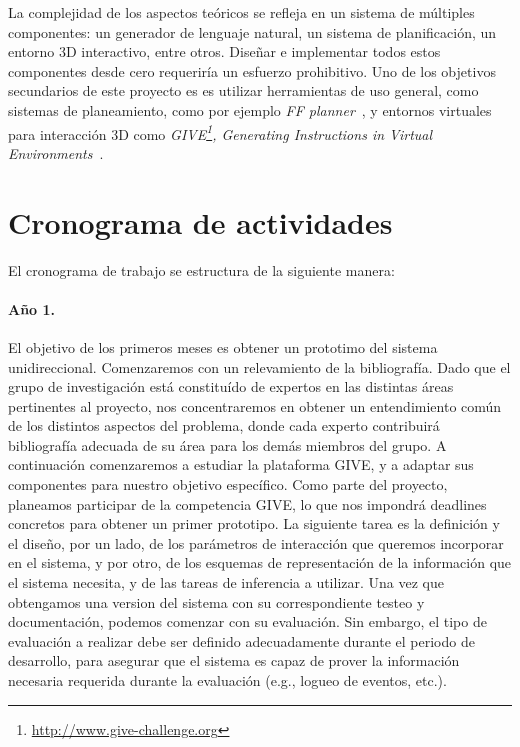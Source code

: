 \documentclass[11pt]{article}
\begin{document}
La complejidad de los aspectos
te\'oricos se refleja en un sistema de m\'ultiples componentes: un generador de
lenguaje natural, un sistema de planificaci\'on, un entorno 3D interactivo,
entre otros. Dise\~nar e implementar todos estos componentes desde cero
requerir\'ia un esfuerzo prohibitivo. Uno de los objetivos secundarios de este
proyecto es es utilizar herramientas de uso general, como sistemas de
planeamiento, como por ejemplo \emph{FF planner}~\citep{hoffmann01}, y
entornos virtuales para interacci\'on 3D como
\emph{GIVE\footnote{\url{http://www.give-challenge.org}}, Generating
Instructions in Virtual Environments}~\citep{byron09}. 

\section{Cronograma de actividades}



El cronograma de trabajo se estructura de la siguiente manera:

\paragraph{A\~no 1.} El objetivo de los primeros meses es obtener un
prototimo del sistema unidireccional.  Comenzaremos con un relevamiento
de la bibliograf\'ia.  Dado que el grupo de investigaci\'on est\'a
constitu\'ido de expertos en las distintas \'areas pertinentes al
proyecto, nos concentraremos en obtener un
entendimiento com\'un de los distintos aspectos del problema, donde
cada experto contribuir\'a bibliograf\'ia adecuada de su \'area para los
dem\'as miembros del grupo.  A continuaci\'on comenzaremos a estudiar
la plataforma GIVE, y a adaptar sus componentes para nuestro objetivo
espec\'ifico.  Como parte del proyecto, planeamos participar de la 
competencia GIVE, lo que nos impondr\'a deadlines concretos para obtener un
primer prototipo.  La siguiente tarea es la definici\'on  y el dise\~no,
por un lado, de los par\'ametros de interacci\'on que queremos incorporar
en el sistema, y por otro, de los esquemas de representaci\'on de la
informaci\'on que el sistema necesita, y de las tareas de inferencia a
utilizar.
Una vez que obtengamos una version del sistema con su
correspondiente testeo y documentaci\'on, podemos comenzar con
su evaluaci\'on.  Sin embargo,
el tipo de evaluaci\'on a realizar debe ser definido
adecuadamente durante el periodo de desarrollo, para asegurar que el sistema
es capaz de prover la informaci\'on necesaria requerida durante la evaluaci\'on
(e.g., logueo de eventos, etc.).
\end{document}
